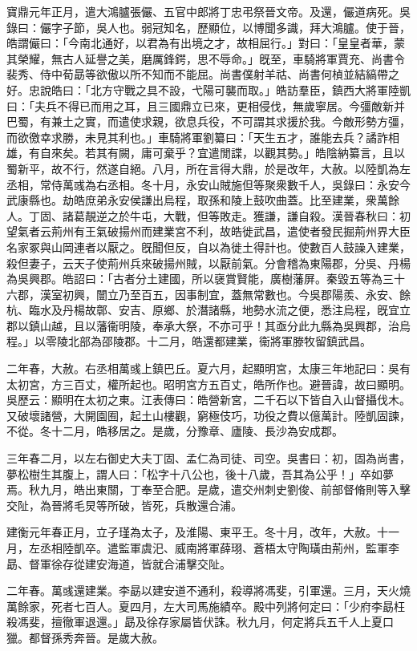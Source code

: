 \begin{pinyinscope}
寶鼎元年正月，遣大鴻臚張儼、五官中郎將丁忠弔祭晉文帝。及還，儼道病死。吳錄曰：儼字子節，吳人也。弱冠知名，歷顯位，以博聞多識，拜大鴻臚。使于晉，皓謂儼曰：「今南北通好，以君為有出境之才，故相屈行。」對曰：「皇皇者華，蒙其榮耀，無古人延譽之美，磨厲鋒鍔，思不辱命。」旣至，車騎將軍賈充、尚書令裴秀、侍中荀勗等欲傲以所不知而不能屈。尚書僕射羊祜、尚書何楨並結縞帶之好。忠說皓曰：「北方守戰之具不設，弋陽可襲而取。」皓訪羣臣，鎮西大將軍陸凱曰：「夫兵不得已而用之耳，且三國鼎立已來，更相侵伐，無歲寧居。今彊敵新并巴蜀，有兼土之實，而遣使求親，欲息兵役，不可謂其求援於我。今敵形勢方彊，而欲徼幸求勝，未見其利也。」車騎將軍劉纂曰：「天生五才，誰能去兵？譎詐相雄，有自來矣。若其有闕，庸可棄乎？宜遣閒諜，以觀其勢。」皓陰納纂言，且以蜀新平，故不行，然遂自絕。八月，所在言得大鼎，於是改年，大赦。以陸凱為左丞相，常侍萬彧為右丞相。冬十月，永安山賊施但等聚衆數千人，吳錄曰：永安今武康縣也。劫皓庶弟永安侯謙出烏程，取孫和陵上鼓吹曲蓋。比至建業，衆萬餘人。丁固、諸葛靚逆之於牛屯，大戰，但等敗走。獲謙，謙自殺。漢晉春秋曰：初望氣者云荊州有王氣破揚州而建業宮不利，故皓徙武昌，遣使者發民掘荊州界大臣名家冢與山岡連者以厭之。旣聞但反，自以為徙土得計也。使數百人鼓譟入建業，殺但妻子，云天子使荊州兵來破揚州賊，以厭前氣。分會稽為東陽郡，分吳、丹楊為吳興郡。皓詔曰：「古者分土建國，所以襃賞賢能，廣樹藩屏。秦毀五等為三十六郡，漢室初興，闓立乃至百五，因事制宜，蓋無常數也。今吳郡陽羨、永安、餘杭、臨水及丹楊故鄣、安吉、原鄉、於潛諸縣，地勢水流之便，悉注烏程，旣宜立郡以鎮山越，且以藩衞明陵，奉承大祭，不亦可乎！其亟分此九縣為吳興郡，治烏程。」以零陵北部為邵陵郡。十二月，皓還都建業，衞將軍滕牧留鎮武昌。

二年春，大赦。右丞相萬彧上鎮巴丘。夏六月，起顯明宮，太康三年地記曰：吳有太初宮，方三百丈，權所起也。昭明宮方五百丈，皓所作也。避晉諱，故曰顯明。吳歷云：顯明在太初之東。江表傳曰：皓營新宮，二千石以下皆自入山督攝伐木。又破壞諸營，大開園囿，起土山樓觀，窮極伎巧，功役之費以億萬計。陸凱固諫，不從。冬十二月，皓移居之。是歲，分豫章、廬陵、長沙為安成郡。

三年春二月，以左右御史大夫丁固、孟仁為司徒、司空。吳書曰：初，固為尚書，夢松樹生其腹上，謂人曰：「松字十八公也，後十八歲，吾其為公乎！」卒如夢焉。秋九月，皓出東關，丁奉至合肥。是歲，遣交州刺史劉俊、前部督脩則等入擊交阯，為晉將毛炅等所破，皆死，兵散還合浦。

建衡元年春正月，立子瑾為太子，及淮陽、東平王。冬十月，改年，大赦。十一月，左丞相陸凱卒。遣監軍虞汜、威南將軍薛珝、蒼梧太守陶璜由荊州，監軍李勗、督軍徐存從建安海道，皆就合浦擊交阯。

二年春。萬彧還建業。李勗以建安道不通利，殺導將馮斐，引軍還。三月，天火燒萬餘家，死者七百人。夏四月，左大司馬施績卒。殿中列將何定曰：「少府李勗枉殺馮斐，擅徹軍退還。」勗及徐存家屬皆伏誅。秋九月，何定將兵五千人上夏口獵。都督孫秀奔晉。是歲大赦。


\end{pinyinscope}
